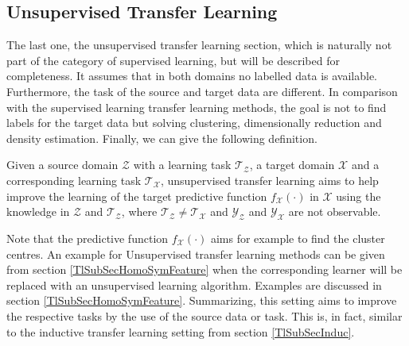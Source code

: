 \subsection{Unsupervised Transfer Learning}\label{TlSubSecUnsuper}
The last one, the unsupervised transfer learning section, which is naturally not part of the category of supervised learning, but will be described for completeness.
It assumes that in both domains no labelled data is available.
Furthermore, the task of the source and target data are different.
In comparison with the supervised learning transfer learning methods, the goal is not to find labels for the target data but solving clustering, dimensionally reduction and density estimation.\cite{Pan.2010}
Finally, we can give the following definition.
\begin{mDef}\label{DefUTL}
	 Given a source domain $\mathcal{Z}$ with a learning task $\mathcal{T_Z}$, a target domain $\mathcal{X}$ and a corresponding learning task $\mathcal{T_X}$, unsupervised transfer learning aims to help improve the learning of the target predictive function $f_\mathcal{X}(\cdot)$ in $\mathcal{X}$ using the knowledge in $\mathcal{Z}$ and $\mathcal{T_Z}$, where $\mathcal{T_Z} \neq \mathcal{T_X}$ and $\mathcal{Y_Z}$ and $\mathcal{Y_X}$ are not observable.
\end{mDef}
Note that the predictive function $f_\mathcal{X}(\cdot)$ aims for example to find the cluster centres.
An example for Unsupervised transfer learning methods can be given from section \ref{TlSubSecHomoSymFeature} when the corresponding learner will be replaced with an unsupervised learning algorithm.
Examples are discussed in section \ref{TlSubSecHomoSymFeature}.
Summarizing, this setting aims to improve the respective tasks by the use of the source data or task.
This is, in fact, similar to the inductive transfer learning setting from section \ref{TlSubSecInduc}.\cite{Pan.2010}


